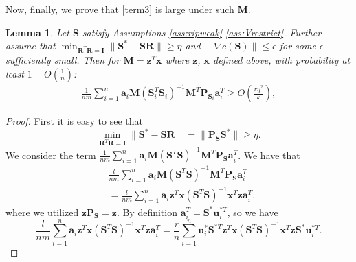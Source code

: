 \documentclass[twoside,11pt]{article}
\newtheorem{lem}{Lemma}
\begin{document}
Now, finally, we prove that \ref{term3} is large under such $\bm{M}$.
\begin{lem}
	\label{lem:term_3_bound}
	Let $\bm{S}$ satisfy Assumptions \ref{ass:ripweak}-\ref{ass:Vrestrict}. Further assume that $\displaystyle \min_{\bm{R}^T\bm{R}=\bm{I}} \|\bm{S}^*-\bm{S}\bm{R}\|\geq \eta$ and $\|\nabla c(\bm{S})\|\leq \epsilon$  for some $\epsilon$ sufficiently small. Then for $\bm{M}=\bm{z}^T\bm{x}$ where $\bm{z}$, $\bm{x}$ defined above, with probability at least $1-O(\frac{1}{n})$:
	\begin{align*}
	\frac{1}{nm}\sum_{i=1}^n \bm{a}_i \bm{M}(\bm{S}_i^T\bm{S}_i)^{-1} \bm{M}^T\bm{P}_{\bm{S}_i} \bm{a}_i^T \geq O\left(\frac{r\eta^2}{k}\right),
	\end{align*}
\end{lem}
\begin{proof}
	First it is easy to see that
	\begin{equation}
	\min_{\bm{R}^T\bm{R}=\bm{I}}\|\bm{S}^*-\bm{S}\bm{R}\|  =\|\bm{P}_{\bm{S}}\bm{S}^*\|\geq \eta.
	\end{equation}
	We 
	consider the term $\frac{1}{nm}\sum_{i=1}^n \bm{a}_i \bm{M}(\bm{S}^T\bm{S})^{-1} \bm{M}^T\bm{P}_{\bm{S}} \bm{a}_i^T$. We have that
	\begin{align*}
	&\frac{l}{nm}\sum_{i=1}^n \bm{a}_i \bm{M}(\bm{S}^T\bm{S})^{-1} \bm{M}^T\bm{P}_{\bm{S}} \bm{a}_i^T\\&= \frac{l}{nm}\sum_{i=1}^n \bm{a}_i \bm{z}^T\bm{x} (\bm{S}^T\bm{S})^{-1} \bm{x}^T\bm{z}\bm{a}_i^T ,
	\end{align*}
	where we utilized $\bm{z}\bm{P}_{\bm{S}}=\bm{z}$. By definition $\bm{a}_i^T=\bm{S}^{*}\bm{u}_i^{*T}$, so we have
	$$ \frac{l}{nm}\sum_{i=1}^n \bm{a}_i \bm{z}^T\bm{x} (\bm{S}^T\bm{S})^{-1} \bm{x}^T\bm{z}\bm{a}_i^T 
	=\frac{r}{n}\sum_{i=1}^n \bm{u}_i^{*}\bm{S}^{*T} \bm{z}^T\bm{x}(\bm{S}^T\bm{S})^{-1} \bm{x}^T\bm{z}\bm{S}^{*}\bm{u}_i^{*T}.$$
	

\end{proof}
\end{document}
